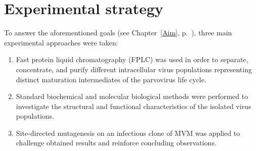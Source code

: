 
\chapter{Experimental strategy} %

\label{Strategy} %


\graphicspath{{./Pictures/}}

To answer the aforementioned goals (see Chapter~\ref{Aim}, p.~\pageref{Aim}), three main experimental approaches were taken:

\bigskip

\begin{enumerate}

\item Fast protein liquid chromatography (FPLC) was used in order to separate, concentrate, and purify different intracellular virus populations representing distinct maturation intermediates of the parvovirus life cycle. 
\item Standard biochemical and molecular biological methods were performed to investigate the structural and functional characteristics of the isolated virus populations.   
\item Site-directed mutagenesis on an infectious clone of MVM was applied to challenge obtained results and reinforce concluding observations.



\end{enumerate}
